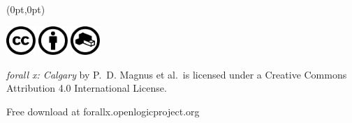 \documentclass{memoir}
\newlength{\coverheight}
\newlength{\spinewidth}
\newlength{\spinepos} %
\begin{document}
\begin{textblock*}{\spinepos}(0pt,0pt)
  \noindent\hspace{1.5cm}
  \begin{minipage}[b][\coverheight][b]{.85\spinepos}
    \begin{minipage}[b]{1.7cm}
      \includegraphics[width=1.1cm]{assets/cc.pdf}
      \includegraphics[width=1.1cm]{assets/by.pdf}
      \includegraphics[width=1.1cm]{assets/remix.pdf}
    \end{minipage}
    \hspace{.3cm}
    \begin{minipage}[b]{5cm}
      \begin{raggedright}
        \fontsize{14pt}{16pt}\selectfont\color{white}
      \textit{forall x: Calgary} by P.~D. Magnus et al.\ is
      licensed under a Creative Commons Attribution 4.0 International
      License.\par
      \end{raggedright}
\end{minipage}
\hfill
\vspace{1cm}

\noindent\fontsize{14pt}{16pt}\selectfont\color{white} Free download at forallx.openlogicproject.org
\vspace*{2cm}
  \end{minipage}
  \hfill
\end{textblock*}
\end{document}
